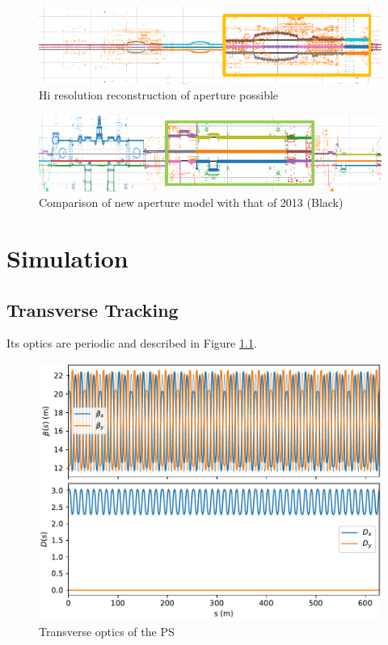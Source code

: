 \begin{figure}
    \centering
    \includegraphics{figs/apertture_hi_res.PNG}
    \caption{Hi resolution reconstruction of aperture possible}
    \label{fig:ps_aperture_hi_res}
\end{figure}

\begin{figure}
    \centering
    \includegraphics{figs/aperture_comparison.PNG}
    \caption{Comparison of new aperture model with that of 2013 (Black)}
    \label{fig:ps_septa}
\end{figure}

\chapter{Simulation}

\section{Transverse Tracking}

Its optics are periodic and described in Figure \ref{fig:ps_optics}.

\begin{figure}
    \centering
    \includegraphics{figs/ps_optics.pdf}
    \caption{Transverse optics of the PS}
    \label{fig:ps_optics}
\end{figure}

